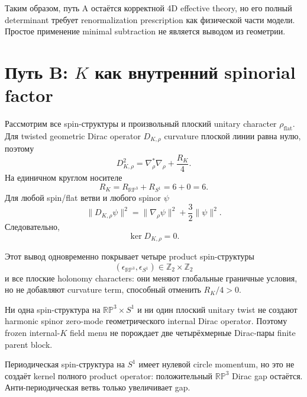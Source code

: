 Таким образом, путь A остаётся корректной 4D effective theory, но его
полный determinant требует renormalization prescription как физической
части модели. Простое применение minimal subtraction не является выводом
из геометрии.

\section{Путь B: \(K\) как внутренний spinorial factor}

Рассмотрим все spin-структуры и произвольный плоский unitary character
\(\rho_{\mathrm{flat}}\). Для twisted geometric Dirac operator
\(D_{K,\rho}\) curvature плоской линии равна нулю, поэтому
\begin{equation}
 D_{K,\rho}^2
 =\nabla_\rho^*\nabla_\rho+\frac{R_K}{4}.
\end{equation}
На единичном круглом носителе
\begin{equation}
 R_K=R_{\mathbb{RP}^3}+R_{S^1}=6+0=6.
\end{equation}
Для любой spin/flat ветви и любого spinor \(\psi\)
\begin{equation}
 \|D_{K,\rho}\psi\|^2
 =\|\nabla_\rho\psi\|^2+\frac32\|\psi\|^2.
\end{equation}
Следовательно,
\begin{equation}
 \ker D_{K,\rho}=0.
\end{equation}

Этот вывод одновременно покрывает четыре product spin-структуры
\begin{equation}
 (\epsilon_{\mathbb{RP}^3},\epsilon_{S^1})
 \in\mathbb Z_2\times\mathbb Z_2
\end{equation}
и все плоские holonomy characters: они меняют глобальные граничные
условия, но не добавляют curvature term, способный отменить
\(R_K/4>0\).

\begin{theorem}
Ни одна spin-структура на \(\mathbb{RP}^3\times S^1\) и ни один плоский
unitary twist не создают harmonic spinor zero-mode геометрического
internal Dirac operator. Поэтому frozen internal-\(K\) field menu не
порождает две четырёхмерные Dirac-пары finite parent block.
\end{theorem}

Периодическая spin-структура на \(S^1\) имеет нулевой circle momentum, но
это не создаёт kernel полного product operator: положительный
\(\mathbb{RP}^3\) Dirac gap остаётся. Анти-периодическая ветвь только
увеличивает gap.

